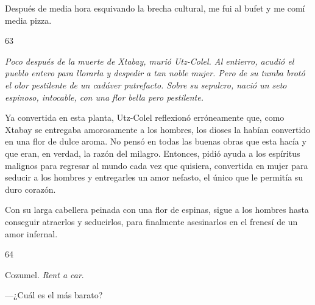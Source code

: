 \documentclass[12pt,twoside,openright,a5paper]{book}
\begin{document}
Después de media hora esquivando la brecha cultural, me fui al bufet y me
comí media pizza.

\vspace{0.5cm}

\hrulefill \hspace{0.1cm}\decofourleft\hspace{0.2cm} 63 \hspace{0.2cm}\decofourright \hspace{0.1cm}\hrulefill

\nopagebreak

\vspace{0.5cm}

\nopagebreak

{\em Poco después de la muerte de Xtabay, murió Utz-Colel. Al entierro,
acudió el pueblo entero para llorarla y despedir a tan noble mujer. Pero de su
tumba brotó el olor pestilente de un cadáver putrefacto.
Sobre su sepulcro, nació un seto espinoso, intocable, con una flor bella pero pestilente.

Ya convertida en esta planta, Utz-Colel reflexionó erróneamente que, como
Xtabay se entregaba amorosamente a los hombres, los dioses la habían
convertido en una flor de dulce aroma. No pensó en todas las buenas obras
que esta hacía y que eran, en verdad, la razón del milagro. Entonces, pidió
ayuda a los espíritus malignos para  regresar al mundo cada vez que quisiera,
convertida en mujer para seducir a los hombres y entregarles un amor nefasto,
el único que le permitía su duro corazón. 

Con su larga cabellera peinada con
una flor de espinas, sigue a los hombres hasta conseguir atraerlos
y seducirlos, para finalmente asesinarlos en el frenesí de un amor infernal.}

\vspace{0.5cm}

\hrulefill \hspace{0.1cm}\decofourleft\hspace{0.2cm} 64 \hspace{0.2cm}\decofourright \hspace{0.1cm}\hrulefill

\nopagebreak

\vspace{0.5cm}

\nopagebreak

Cozumel. \emph{Rent a car}.

---¿Cuál es el más barato?
\end{document}

